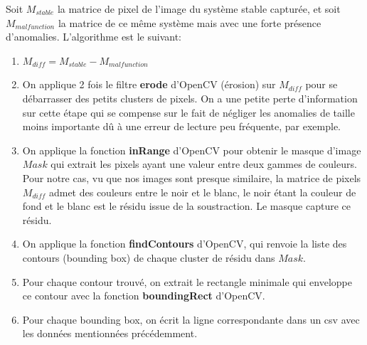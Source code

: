 \documentclass[french]{article}
\theoremstyle{mytheoremstyle}
\theoremstyle{mytheoremstyle}
\theoremstyle{myproblemstyle}
\begin{document}
        \newline
        Soit $M_{stable}$ la matrice de pixel de l'image du système stable capturée, et soit $M_{malfunction}$ la matrice de ce même système mais avec une forte présence d'anomalies.
        L'algorithme est le suivant:
        \begin{enumerate}
            \item $M_{diff} = M_{stable} - M_{malfunction}$
            \item On applique 2 fois le filtre \textbf{erode} d'OpenCV (érosion) sur $M_{diff}$ pour se débarrasser des petits clusters de pixels. On a une petite perte d'information sur cette étape qui se compense sur le fait de négliger les anomalies de taille moins importante dû à une erreur de lecture peu fréquente, par exemple.
            \item On applique la fonction \textbf{inRange} d'OpenCV pour obtenir le masque d'image $Mask$ qui extrait les pixels ayant une valeur entre deux gammes de couleurs. Pour notre cas, vu que nos images sont presque similaire, la matrice de pixels $M_{diff}$ admet des couleurs entre le noir et le blanc, le noir étant la couleur de fond et le blanc est le résidu issue de la soustraction. Le masque capture ce résidu.
            \item On applique la fonction \textbf{findContours} d'OpenCV, qui renvoie la liste des contours (bounding box) de chaque cluster de résidu dans $Mask$.
            \item Pour chaque contour trouvé, on extrait le rectangle minimale qui enveloppe ce contour avec la fonction \textbf{boundingRect} d'OpenCV.
            \item Pour chaque bounding box, on écrit la ligne correspondante dans un csv avec les données mentionnées précédemment.
        \end{enumerate}
\end{document}
